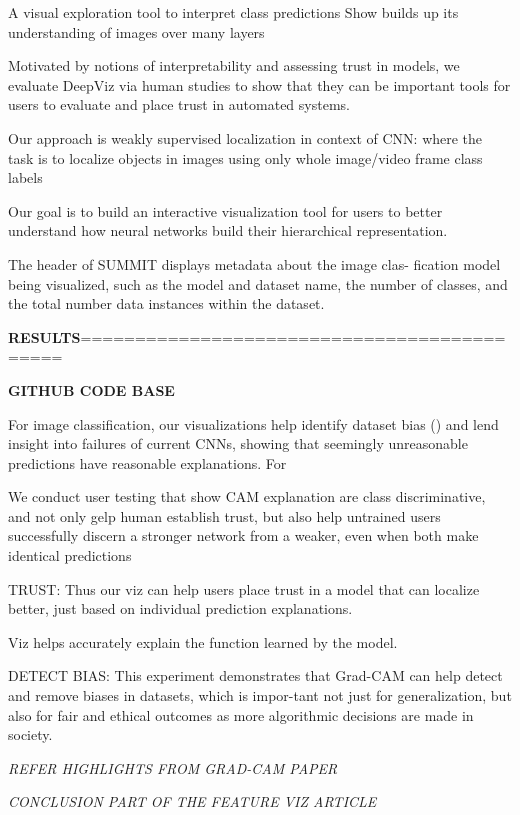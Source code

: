 A visual exploration tool to interpret class predictions
Show builds up its understanding of images over many layers

Motivated by notions of interpretability and assessing trust in models, we evaluate DeepViz via human studies to show that they can be important tools for users to evaluate and place trust in automated systems.

Our approach is weakly supervised localization in context of CNN: where the task is to localize objects in images using only whole image/video frame class labels

Our goal is to build an interactive visualization tool for users to better
understand how neural networks build their hierarchical representation.


  The header of SUMMIT displays metadata about the image clas-
fication model being visualized, such as the model and dataset name, the number of classes, and the total number data instances within the dataset.

\textbf{RESULTS}============================================

\textbf{GITHUB CODE BASE}

For image classification, our visualizations help identify dataset bias () and lend insight into failures of current CNNs, showing that seemingly unreasonable predictions have reasonable explanations. For

We conduct user testing that show CAM explanation are class discriminative, and not only gelp  human establish trust, but also help untrained users successfully discern a stronger network from a weaker, even when both make identical predictions

TRUST: Thus our viz can help users place trust in a model that can localize better, just based on individual prediction explanations.

Viz helps accurately explain the function learned by the model.

DETECT BIAS: This experiment demonstrates that Grad-CAM can
help detect and remove biases in datasets, which is impor-tant not just for generalization, but also for fair and ethical
outcomes as more algorithmic decisions are made in society.

\textit{REFER HIGHLIGHTS FROM GRAD-CAM PAPER}

\textit{CONCLUSION PART OF THE FEATURE VIZ ARTICLE}



